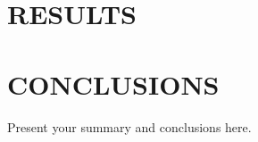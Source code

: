 \documentclass[letterpaper]{physor2020}
\begin{document}
\section{RESULTS}
\label{sec:res}


\section{CONCLUSIONS}
\label{sec:conc}

Present your summary and conclusions here.




\end{document}
